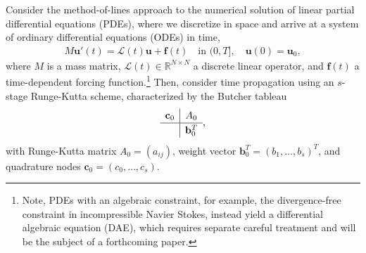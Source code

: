 \documentclass[review]{siamart}
\begin{document}
Consider the method-of-lines approach to the numerical solution of linear
partial differential equations (PDEs), where we discretize in space and arrive
at a system of ordinary differential equations (ODEs) in time,
%
\begin{align*}
M\mathbf{u}'(t) =  \mathcal{L}(t)\mathbf{u} + \mathbf{f}(t)
	\quad\text{in }(0,T], \quad \mathbf{u}(0) = \mathbf{u}_0,
\end{align*}
%
where $M$ is a mass matrix, $\mathcal{L}(t)\in\mathbb{R}^{N\times N}$ a discrete
linear operator, and $\mathbf{f}(t)$ a time-dependent forcing
function.\footnote{Note,
PDEs with an algebraic constraint, for example, the divergence-free
constraint in incompressible Navier Stokes, instead yield a differential algebraic equation (DAE), which
requires separate careful treatment and will be the subject of a forthcoming paper.}
Then, consider time propagation using an $s$-stage Runge-Kutta scheme,
characterized by the Butcher tableau
%
\begin{align*}
	\renewcommand\arraystretch{1.2}
	\begin{array}
	{c|c}
	\mathbf{c}_0 & A_0\\
	\hline
	& \mathbf{b}_0^T
	\end{array},
\end{align*}
%
with Runge-Kutta matrix $A_0 = (a_{ij})$, weight vector $\mathbf{b}_0^T = (b_1,
\ldots, b_s)^T$, and quadrature nodes $\mathbf{c}_0 = (c_0, \ldots, c_s)$.
\end{document}

